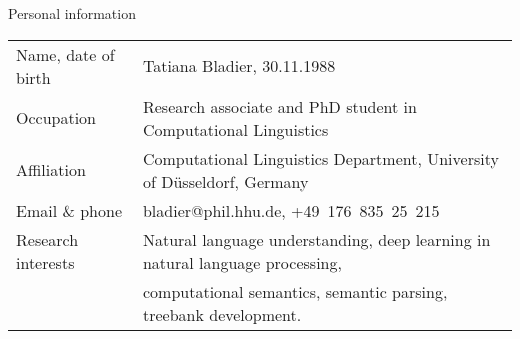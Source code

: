 \documentclass{resume} %
\begin{document}
\thispagestyle{empty}


\begin{rSection}{Personal information}

\hspace{-20pt}
\begin{tabular}{p{4cm}p{16cm}}
 Name, date of birth    & Tatiana Bladier, 30.11.1988 \\
  Occupation & Research associate and PhD student  in Computational Linguistics \\
 Affiliation  & Computational Linguistics Department, University of D{\"u}sseldorf, Germany \\
 Email \& phone  & bladier@phil.hhu.de, +49~176~835~25~215 \\
 Research interests  & Natural language understanding, deep learning in natural language processing, \\  &  computational semantics, semantic parsing, treebank development. 
\end{tabular}

\end{rSection}

\smallskip


\end{document}
